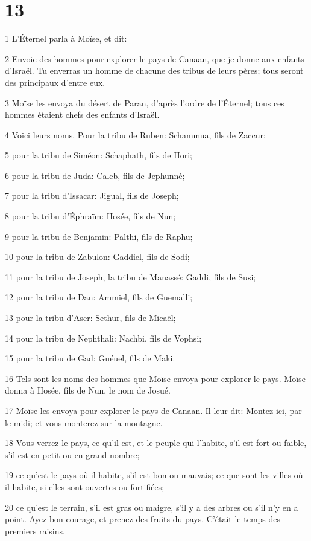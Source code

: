 \chapter{13}

\par 1 L'Éternel parla à Moïse, et dit:
\par 2 Envoie des hommes pour explorer le pays de Canaan, que je donne aux enfants d'Israël. Tu enverras un homme de chacune des tribus de leurs pères; tous seront des principaux d'entre eux.
\par 3 Moïse les envoya du désert de Paran, d'après l'ordre de l'Éternel; tous ces hommes étaient chefs des enfants d'Israël.
\par 4 Voici leurs noms. Pour la tribu de Ruben: Schammua, fils de Zaccur;
\par 5 pour la tribu de Siméon: Schaphath, fils de Hori;
\par 6 pour la tribu de Juda: Caleb, fils de Jephunné;
\par 7 pour la tribu d'Issacar: Jigual, fils de Joseph;
\par 8 pour la tribu d'Éphraïm: Hosée, fils de Nun;
\par 9 pour la tribu de Benjamin: Palthi, fils de Raphu;
\par 10 pour la tribu de Zabulon: Gaddiel, fils de Sodi;
\par 11 pour la tribu de Joseph, la tribu de Manassé: Gaddi, fils de Susi;
\par 12 pour la tribu de Dan: Ammiel, fils de Guemalli;
\par 13 pour la tribu d'Aser: Sethur, fils de Micaël;
\par 14 pour la tribu de Nephthali: Nachbi, fils de Vophsi;
\par 15 pour la tribu de Gad: Guéuel, fils de Maki.
\par 16 Tels sont les noms des hommes que Moïse envoya pour explorer le pays. Moïse donna à Hosée, fils de Nun, le nom de Josué.
\par 17 Moïse les envoya pour explorer le pays de Canaan. Il leur dit: Montez ici, par le midi; et vous monterez sur la montagne.
\par 18 Vous verrez le pays, ce qu'il est, et le peuple qui l'habite, s'il est fort ou faible, s'il est en petit ou en grand nombre;
\par 19 ce qu'est le pays où il habite, s'il est bon ou mauvais; ce que sont les villes où il habite, si elles sont ouvertes ou fortifiées;
\par 20 ce qu'est le terrain, s'il est gras ou maigre, s'il y a des arbres ou s'il n'y en a point. Ayez bon courage, et prenez des fruits du pays. C'était le temps des premiers raisins.
